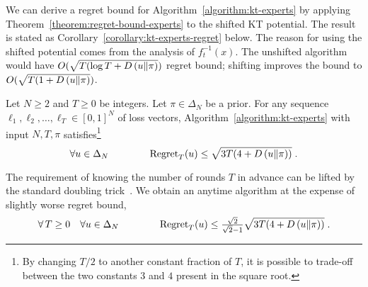 We can derive a regret bound for Algorithm~\ref{algorithm:kt-experts} by
applying Theorem~\ref{theorem:regret-bound-experts} to the shifted KT potential.
The result is stated as Corollary~\ref{corollary:kt-experts-regret} below.
The reason for using the shifted
potential comes from the analysis of $f_t^{-1}(x)$. The unshifted algorithm would
have $O(\sqrt{T (\log T + D\left({u}\middle\|{\pi}\right)})$ regret bound; shifting improves the
bound to $O(\sqrt{T (1 + D\left({u}\middle\|{\pi}\right)})$.

\begin{corollary}
\label{corollary:kt-experts-regret}
Let $N \ge 2$ and $T \ge 0$ be integers. Let $\pi \in \Delta_N$ be a prior.
For any sequence $\ell_1, \ell_2, \dots, \ell_T \in
[0,1]^N$ of loss vectors, Algorithm~\ref{algorithm:kt-experts}
with input $N,T,\pi$ satisfies\footnote{By changing $T/2$ to another constant
fraction of $T$, it is possible to trade-off between the two constants $3$ and
$4$ present in the square root.}
$$
\forall u \in \Delta_N \qquad \qquad \operatorname{Regret}_T(u) \le \sqrt{3T (4 + D\left({u}\middle\|{\pi}\right))} \; .
$$
\end{corollary}


The requirement of knowing the number of rounds $T$ in advance can be lifted by
the standard doubling trick~\citep[Section 2.3.1]{Shalev-Shwartz-2011}. We obtain
an anytime algorithm at the expense of slightly worse regret bound,
$$
\forall \, T \ge 0 \quad \forall u \in \Delta_N \qquad \qquad
\operatorname{Regret}_T(u) \le \tfrac{\sqrt{2}}{\sqrt{2} - 1} \sqrt{3T (4 + D\left({u}\middle\|{\pi}\right))} \; .
$$

